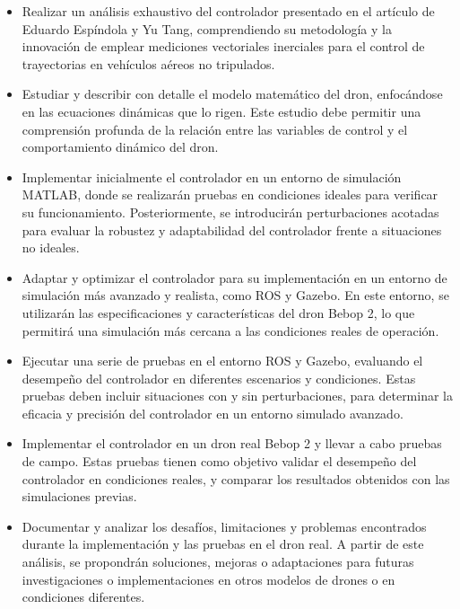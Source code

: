 \begin{itemize}
	\item Realizar un análisis exhaustivo del controlador presentado en el artículo de Eduardo Espíndola y Yu Tang, comprendiendo su metodología y la innovación de emplear mediciones vectoriales inerciales para el control de trayectorias en vehículos aéreos no tripulados.
	
	\item Estudiar y describir con detalle el modelo matemático del dron, enfocándose en las ecuaciones dinámicas que lo rigen. Este estudio debe permitir una comprensión profunda de la relación entre las variables de control y el comportamiento dinámico del dron.
	
	\item Implementar inicialmente el controlador en un entorno de simulación MATLAB, donde se realizarán pruebas en condiciones ideales para verificar su funcionamiento. Posteriormente, se introducirán perturbaciones acotadas para evaluar la robustez y adaptabilidad del controlador frente a situaciones no ideales.
	
	\item Adaptar y optimizar el controlador para su implementación en un entorno de simulación más avanzado y realista, como ROS y Gazebo. En este entorno, se utilizarán las especificaciones y características del dron Bebop 2, lo que permitirá una simulación más cercana a las condiciones reales de operación.
	
	\item Ejecutar una serie de pruebas en el entorno ROS y Gazebo, evaluando el desempeño del controlador en diferentes escenarios y condiciones. Estas pruebas deben incluir situaciones con y sin perturbaciones, para determinar la eficacia y precisión del controlador en un entorno simulado avanzado.
	
	\item Implementar el controlador en un dron real Bebop 2 y llevar a cabo pruebas de campo. Estas pruebas tienen como objetivo validar el desempeño del controlador en condiciones reales, y comparar los resultados obtenidos con las simulaciones previas.
	
	\item Documentar y analizar los desafíos, limitaciones y problemas encontrados durante la implementación y las pruebas en el dron real. A partir de este análisis, se propondrán soluciones, mejoras o adaptaciones para futuras investigaciones o implementaciones en otros modelos de drones o en condiciones diferentes.
\end{itemize}

